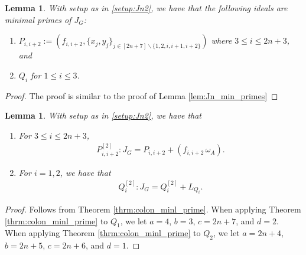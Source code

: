 \documentclass[12pt,a4paper]{amsart}
\theoremstyle{plain}
\newtheorem{lem}[thrm]{Lemma}
\def\blem{\begin{lem}}
\def\elem{\end{lem}}
\theoremstyle{definition}
\def\bproof{\begin{proof}}
\def\eproof{\end{proof}}
\theoremstyle{remark}
\let\setminus=\smallsetminus
\begin{document}
\blem
\label{lem:jn2_min_primes}
With setup as in \ref{setup:Jn2}, we have that the following ideals are minimal primes of $J_{G}$:
\begin{enumerate}
\item $P_{i,i+2} := \left( f_{i,i+2},\{x_{j},y_{j}\}_{j\in[2n+7] \setminus \{ 1,2,i,i+1,i+2 \}} \right)$ where $3 \leq i \leq 2n+3$, and
\item $Q_{i}$ for $1 \leq i \leq 3$.
\end{enumerate}
\elem

\bproof
The proof is similar to the proof of Lemma \ref{lem:Jn_min_primes}
\eproof


\blem
\label{lem:colon_minl_primes_J_n_2}
With setup as in \ref{setup:Jn2}, we have that
\begin{enumerate}
\item For $3 \leq i \leq 2n+3$,
\begin{align*}
P_{i,i+2}^{[2]}:J_{G} = P_{i,i+2} + (f_{i,i+2} \, \omega_{A}).
\end{align*}
\item For $i = 1,2$, we have that
\begin{align*}
Q_{i}^{[2]}:J_{G} = Q_{i}^{[2]} + L_{Q_{i}}.
\end{align*}
\end{enumerate}
\elem

\bproof
Follows from Theorem \ref{thrm:colon_minl_prime}. When applying Theorem \ref{thrm:colon_minl_prime} to $Q_{1}$, we let $a = 4$, $b = 3$, $c = 2n+7$, and $d = 2$. When applying Theorem \ref{thrm:colon_minl_prime} to $Q_{2}$, we let $a = 2n+4$, $b = 2n+5$, $c = 2n+6$, and $d = 1$.
\eproof

\end{document}
